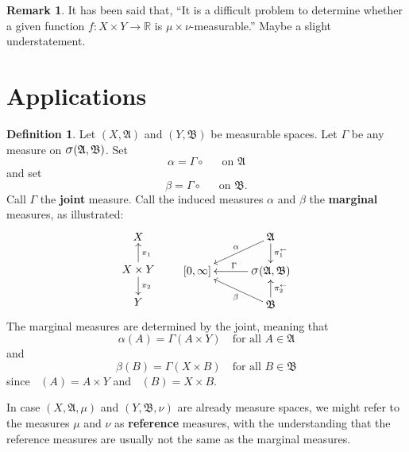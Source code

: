 \documentclass[
twoside=true,
paper=letter,
fontsize=9pt,
pagesize=auto,
leqno,
openany,
headsepline,
overfullrule,
]{scrbook}
\theoremstyle{plain}
\theoremstyle{plain}
\theoremstyle{definition}
\newtheorem{defn}[thm]{Definition}
\newtheorem{rmk}[thm]{Remark}
\theoremstyle{bfnoteitalic}
\theoremstyle{bfnoteroman}
\newcommand{\sigalg}[1]{\mathfrak{#1}}
\newcommand{\sagb}{\mathop{\hbox{\large{$\sigma$}}}\nolimits}
\newcommand{\preimage}[1]{\mathop{#1^{\leftarrow}}}
\newcommand{\R}{\mathbb{R}}
\newcommand{\sigmaalgebra}{\sigalg{A}}
\newcommand{\sigmaalgebraii}{\sigalg{B}}
\newcommand{\productsig}[2]{\sagb(#1,#2)}
\newcommand{\function}{f}
\newcommand{\measurespace}{X}
\newcommand{\measurespaceii}{Y}
\newcommand{\measmu}{\mu}
\newcommand{\measnu}{\nu}
\newcommand{\seti}{A}
\newcommand{\setii}{B}
\newcommand{\projectionone}{\pi_1}
\newcommand{\projectiontwo}{\pi_2}
\newcommand{\measonprod}{\Gamma}%
\newcommand{\marginalone}{\alpha}%
\newcommand{\marginaltwo}{\beta}%
\begin{document}
\begin{rmk}
It has been said that, ``It is a difficult problem to determine whether a given function 
$\function:\measurespace\times\measurespaceii\to\R$ is $\measmu\times\measnu$-measurable.''
Maybe a slight understatement.
\end{rmk}



\section{Applications}\label{product_integration_applications}





\begin{defn}\label{marginals}
Let $(\measurespace,\sigmaalgebra)$ and 
$(\measurespaceii,\sigmaalgebraii)$ be measurable spaces.
Let $\measonprod$ be any measure on
$\productsig{\sigmaalgebra}{\sigmaalgebraii}$.
Set
\[
\marginalone
=
\measonprod \circ \preimage{\projectionone}
\quad
\text{on }
\sigmaalgebra
\]
and set
\[
\marginaltwo
=
\measonprod \circ \preimage{\projectiontwo}
\quad
\text{on }
\sigmaalgebraii.
\]
Call $\measonprod$ the \textbf{joint} measure.
Call the induced measures
$\marginalone$ and $\marginaltwo$ the \textbf{marginal} measures, as illustrated:
\[
\xymatrix@R=16pt@C=30pt{
\measurespace 
\\
\measurespace\times\measurespaceii 
\ar[u]_{\projectionone}
\ar[d]^{\projectiontwo} 
\\
\measurespaceii
}
\qquad
\xymatrix@R=16pt@C=30pt{ 
 & \sigmaalgebra 
 \ar[d]^-{\preimage{\projectionone}} 
 \ar[dl]_-{\marginalone} 
\\
[0,\infty] 
& \productsig{\sigmaalgebra}{\sigmaalgebraii} \ar[l]_{\measonprod}
\\
 & \sigmaalgebraii \ar[u]_-{\preimage{\projectiontwo}} 
 \ar[ul]^-{\marginaltwo}
\\
}
\]
The marginal measures are determined by the joint,
meaning that
\[
\marginalone(\seti)=\measonprod(\seti\times\measurespaceii)
\quad
\text{for all $\seti\in\sigmaalgebra$}
\]
and
\[
\marginaltwo(\setii)=\measonprod(\measurespace\times\setii)
\quad
\text{for all $\setii\in\sigmaalgebraii$}
\]
since
$\preimage{\projectionone}(\seti) = \seti\times\measurespaceii$
and
$\preimage{\projectiontwo}(\setii) = \measurespace\times\setii$.


In case  $(\measurespace,\sigmaalgebra,\measmu)$ and
$(\measurespaceii,\sigmaalgebraii,\measnu)$ are already measure spaces, we might refer to the measures
$\measmu$ and $\measnu$ as \textbf{reference} measures, with the understanding that the reference measures are usually not the same as the marginal measures.
\end{defn}
\end{document}
